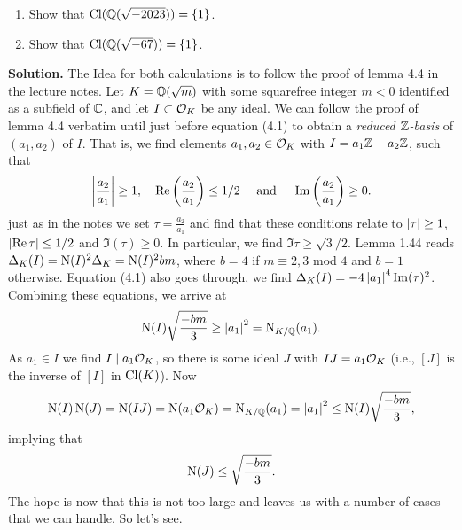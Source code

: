 \documentclass[a4paper,11pt]{article}
\begin{document}
\begin{enumerate}
    \item Show that $\operatorname{Cl}(\mathbb{Q}(\sqrt{-2023})) = \{1\}$.
    \item Show that $\operatorname{Cl}(\mathbb{Q}(\sqrt{-67})) = \{1\}$.
\end{enumerate}
\textbf{Solution.}
The Idea for both calculations is to follow the proof of lemma 4.4 in the lecture
notes. Let $K = \mathbb{Q}(\sqrt m)$ with some squarefree integer $m<0$ identified as a
subfield of $\mathbb{C}$, and let $I \subset \mathcal{O}_K$ be any ideal. We can follow the
proof of lemma 4.4 verbatim until just before equation (4.1) to obtain a
\emph{reduced $\mathbb{Z}$-basis} of $(a_1, a_2)$ of $I$. That is, we find elements
$a_1, a_2 \in \mathcal{O}_K$ with $I = a_1 \mathbb{Z} + a_2 \mathbb{Z}$, such that 
\begin{equation*}
    \left\lvert \frac {a_2}{a_1} \right\rvert \geq 1, \quad \operatorname{Re}\left(\frac{a_2}{a_1} \right) \leq 1/2
    \quad \text{ and } \quad \operatorname{Im}\left(\frac{a_2}{a_1} \right) \geq 0.
\end{equation*}
just as in the notes we set $\tau = \frac {a_2}{a_1}$ and find that these conditions
relate to $\left\lvert \tau \right\rvert \geq 1$, $\left\lvert \operatorname{Re} \tau \right\rvert \leq 1/2$ and 
$\Im(\tau) \geq 0$. In particular, we find $\Im \tau \geq \sqrt 3 /2$. 
Lemma 1.44 reads $\Delta_K(I) = \operatorname{N}(I)^2\Delta_K = \operatorname{N}(I)^2bm$, where $b=4$ if 
$m \equiv 2,3$ mod $4$ and $b=1$ otherwise. 
Equation (4.1) also goes through, we find $\Delta_K(I) = -4 \left\lvert a_1 \right\rvert^4 \operatorname{Im}(\tau)^2$.
Combining these equations, we arrive at 
\begin{equation*}
    \operatorname{N}(I) \sqrt{\frac{-bm}3} \geq \left\lvert a_1 \right\rvert^2 = \operatorname{N}_{K/\mathbb{Q}}(a_1).
\end{equation*}
As $a_1 \in I$ we find $I \mid a_1 \mathcal{O}_K$, so there is some ideal $J$ with
$IJ = a_1 \mathcal{O}_K$ (i.e., $[J]$ is the inverse of $[I]$ in $\operatorname{Cl}(K)$). Now
\begin{equation*}
    \operatorname{N}(I) \operatorname{N}(J) = \operatorname{N}(IJ) = \operatorname{N}(a_1 \mathcal{O}_K) = \operatorname{N}_{K/\mathbb{Q}}(a_1) = \left\lvert a_1 \right\rvert^2 
    \leq \operatorname{N}(I) \sqrt{\frac{-bm}3},
\end{equation*}
implying that 
\begin{equation*}
    \operatorname{N}(J) \leq \sqrt{\frac{-bm}3}.
\end{equation*}
The hope is now that this is not too large and leaves us with a number of cases 
that we can handle. So let's see.
\end{document}
